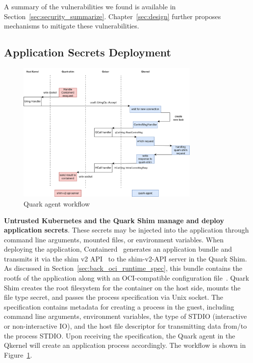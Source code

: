 A summary of the vulnerabilities we found is available in Section~\ref{sec:security_summarize}. Chapter~\ref{sec:design} further proposes mechanisms to mitigate these vulnerabilities.


\subsection{Application Secrets Deployment}
\begin{figure}[htp]
    \centering
    \includegraphics[width=0.8\textwidth]{images/quark-agent-work-flow.png}
    \caption[Quark Agent Workflow]{Quark agent workflow}
    \label{fig:quark_agent_work_flow}
\end{figure}


\textbf{Untrusted Kubernetes and the Quark Shim manage and deploy application secrets}. 
These secrets may be injected into the application through command line arguments, mounted files, or environment variables. When deploying the application, Containerd~\cite*{containerd} generates an application 
bundle and transmits it via the shim v2 API~\cite*{shim_v2} to the shim-v2-API server in the Quark Shim.  As discussed in Section~\ref{sec:back_oci_runtime_spec}, this bundle contains the rootfs of the application along with an OCI-compatible configuration file~\cite*{oci-runtime-spec}. Quark Shim creates the root filesystem for the container on the host side, 
mounts the file type secret, and passes the process specification via Unix socket. The specification contains metadata for creating a process in the guest, including command line arguments, environment variables, the type of STDIO (interactive or non-interactive IO), and the host file descriptor 
for transmitting data from/to the process STDIO. Upon receiving the specification, the Quark agent in the Qkernel will create an application process accordingly.  The workflow is shown in Figure~\ref{fig:quark_agent_work_flow}.

